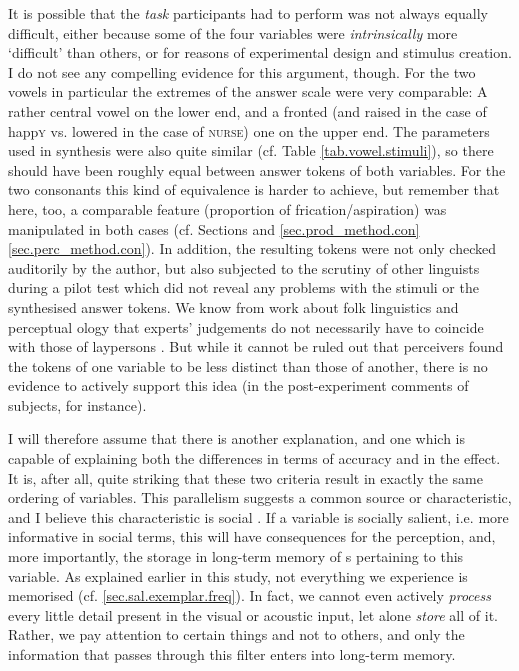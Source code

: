 It is possible that the \emph{task} participants had to perform was not always equally difficult, either because some of the four variables were \emph{intrinsically} more `difficult' than others, or for reasons of experimental design and stimulus creation.
I do not see any compelling evidence for this argument, though.
For the two vowels in particular the extremes of the answer scale were very comparable: A rather central vowel on the lower end, and a fronted (and raised in the case of happ\textsc{y} vs. lowered in the case of \textsc{nurse)} one on the upper end.
The parameters used in synthesis were also quite similar (cf. Table \ref{tab.vowel.stimuli}), so there should have been roughly equal  between answer tokens of both variables.
For the two consonants this kind of equivalence is harder to achieve, but remember that here, too, a comparable feature (proportion of frication/aspiration) was manipulated in both cases (cf. Sections and \ref{sec.prod_method.con} \ref{sec.perc_method.con}).
In addition, the resulting tokens were not only checked auditorily by the author, but also subjected to the scrutiny of other linguists during a pilot test which did not reveal any problems with the stimuli or the synthesised answer tokens.
We know from work about folk linguistics and perceptual ology that experts' judgements do not necessarily have to coincide with those of laypersons \parencite{preston1999,niedzielskipreston2000}.
But while it cannot be ruled out that perceivers found the tokens of one variable to be less distinct than those of another, there is no evidence to actively support this idea (in the post-experiment comments of subjects, for instance). 

I will therefore assume that there is another explanation, and one which is capable of explaining both the differences in terms of accuracy and in the  effect.
It is, after all, quite striking that these two criteria result in exactly the same ordering of variables.
This parallelism suggests a common source or characteristic, and I believe this characteristic is social .
If a variable is socially salient, i.e. more informative in social terms, this will have consequences for the perception, and, more importantly, the storage in long-term memory of s pertaining to this variable.
As explained earlier in this study, not everything we experience is memorised (cf. \ref{sec.sal.exemplar.freq}).
In fact, we cannot even actively \emph{process} every little detail present in the visual or acoustic input, let alone \emph{store} all of it.
Rather, we pay attention to certain things and not to others, and only the information that passes through this filter enters into long-term memory.

